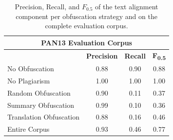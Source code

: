 \begin{table}[ht]
    \centering
    \caption{Precision, Recall, and $F_{0.5}$ of the text alignment component per obfuscation strategy and on the complete evaluation corpus.}
    \label{tab:evaluation}
    \begin{tabular}{lccc}
    \multicolumn{4}{c}{\textsf{\textbf{PAN13 Evaluation Corpus}}} \\[1.1ex]
    \toprule
                            &  \textsf{\textbf{Precision}} &  \textsf{\textbf{Recall}} &\textsf{\textbf{F\textsubscript{0.5}}} \\
    \midrule
    No Obfuscation          &       0.88 &    0.90 &  0.88 \\
    No Plagiarism           &       1.00 &    1.00 &  1.00 \\
    Random Obfuscation      &       0.90 &    0.11 &  0.37 \\
    Summary Obfuscation     &       0.99 &    0.10 &  0.36 \\
    Translation Obfuscation &       0.88 &    0.16 &  0.46 \\ \midrule
    Entire Corpus           &       0.93 &    0.46 &  0.77 \\
    \bottomrule
    \end{tabular}
\end{table}
